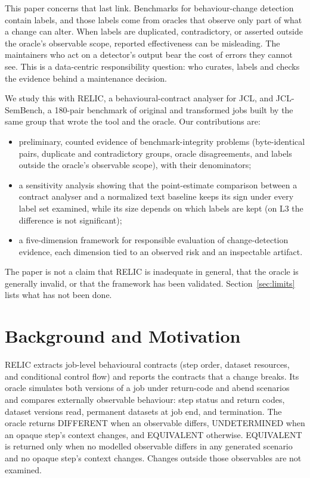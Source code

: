 \documentclass[conference]{IEEEtran}
\begin{document}
This paper concerns that last link. Benchmarks for behaviour-change detection contain labels, and those labels come from oracles that observe only part of what a change can alter. When labels are duplicated, contradictory, or asserted outside the oracle's observable scope, reported effectiveness can be misleading. The maintainers who act on a detector's output bear the cost of errors they cannot see. This is a data-centric responsibility question: who curates, labels and checks the evidence behind a maintenance decision.

We study this with RELIC, a behavioural-contract analyser for JCL, and JCL-SemBench, a 180-pair benchmark of original and transformed jobs built by the same group that wrote the tool and the oracle. Our contributions are:
\begin{itemize}
\item preliminary, counted evidence of benchmark-integrity problems (byte-identical pairs, duplicate and contradictory groups, oracle disagreements, and labels outside the oracle's observable scope), with their denominators;
\item a sensitivity analysis showing that the point-estimate comparison between a contract analyser and a normalized text baseline keeps its sign under every label set examined, while its size depends on which labels are kept (on L3 the difference is not significant);
\item a five-dimension framework for responsible evaluation of change-detection evidence, each dimension tied to an observed risk and an inspectable artifact.
\end{itemize}
The paper is not a claim that RELIC is inadequate in general, that the oracle is generally invalid, or that the framework has been validated. Section~\ref{sec:limits} lists what has not been done.

\section{Background and Motivation}
RELIC extracts job-level behavioural contracts (step order, dataset resources, and conditional control flow) and reports the contracts that a change breaks. Its oracle simulates both versions of a job under return-code and abend scenarios and compares externally observable behaviour: step status and return codes, dataset versions read, permanent datasets at job end, and termination. The oracle returns DIFFERENT when an observable differs, UNDETERMINED when an opaque step's context changes, and EQUIVALENT otherwise. EQUIVALENT is returned only when no modelled observable differs in any generated scenario and no opaque step's context changes. Changes outside those observables are not examined.
\end{document}
